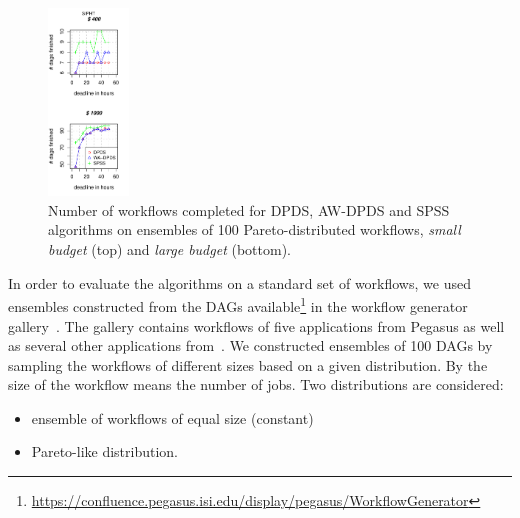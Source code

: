 \documentclass{sig-alternate}
\begin{document}
\begin{figure}[t]
\includegraphics[width=0.19\textwidth]{figures/pareto-SIPHT-n-1000-8-dagh5-50m0.pdf}
\caption{Number of workflows completed for DPDS, AW-DPDS and SPSS
algorithms on ensembles of 100 Pareto-distributed workflows, {\em small budget}
(top) and {\em large budget} (bottom).}
\label{fig:number-complete-pareto}
\end{figure}






In order to evaluate the algorithms on a standard set of workflows, we used
ensembles constructed from the DAGs available\footnote{\url{https://confluence.pegasus.isi.edu/display/pegasus/WorkflowGenerator}}
in the workflow generator gallery~\cite{Bharathi08}. The gallery contains
workflows of five applications from Pegasus as well as several other applications 
from~\cite{Ramakrishnan08}. We constructed ensembles of 100 DAGs by sampling the
workflows of different sizes based on a given distribution. By the size of the
workflow means the number of jobs. Two distributions are considered:
\begin{itemize}
  \item ensemble of workflows of equal size (constant)
  \item Pareto-like distribution.
\end{itemize}
\end{document}
